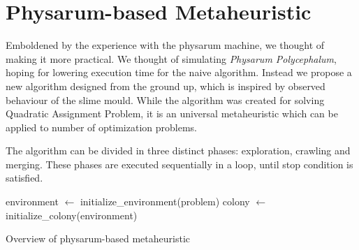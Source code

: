\section{Physarum-based Metaheuristic}
\label{section:algorithm_metaheuristic}

Emboldened by the experience with the physarum machine, we thought of making it more practical. We thought of simulating \textit{Physarum Polycephalum}, hoping for lowering execution time for the naive algorithm. Instead we propose a new algorithm designed from the ground up, which is inspired by observed behaviour of the slime mould. While the algorithm was created for solving Quadratic Assignment Problem, it is an universal metaheuristic which can be applied to number of optimization problems.

The algorithm can be divided in three distinct phases: exploration, crawling and merging. These phases are executed sequentially in a loop, until stop condition is satisfied.

\begin{algorithm}[H]

  \BlankLine
  environment $\leftarrow$ initialize\_environment(problem)\;
  colony $\leftarrow$ initialize\_colony(environment)\;


  \;

  \caption{Overview of physarum-based metaheuristic}
  \label{algorithm:m_general}
\end{algorithm}
